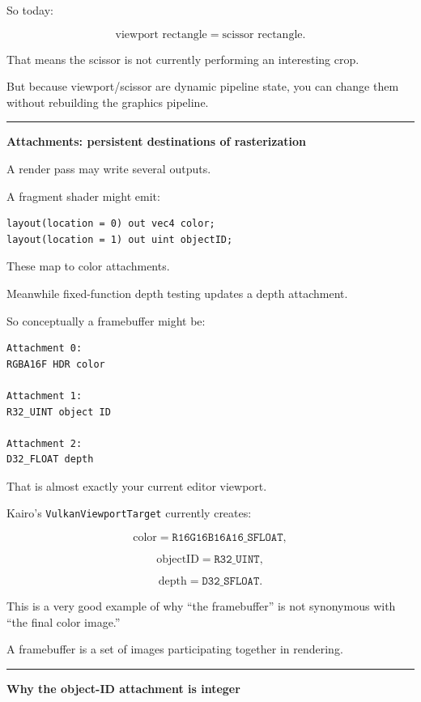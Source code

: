 So today:

\[
\text{viewport rectangle}
=
\text{scissor rectangle}.
\]

That means the scissor is not currently performing an interesting crop.

But because viewport/scissor are dynamic pipeline state, you can change them without rebuilding the graphics pipeline.

\begin{center}\rule{0.5\linewidth}{0.5pt}\end{center}

\textbf{Attachments: persistent destinations of rasterization}

A render pass may write several outputs.

A fragment shader might emit:

\begin{verbatim}
layout(location = 0) out vec4 color;
layout(location = 1) out uint objectID;
\end{verbatim}

These map to color attachments.

Meanwhile fixed-function depth testing updates a depth attachment.

So conceptually a framebuffer might be:

\begin{verbatim}
Attachment 0:
RGBA16F HDR color

Attachment 1:
R32_UINT object ID

Attachment 2:
D32_FLOAT depth
\end{verbatim}

That is almost exactly your current editor viewport.

Kairo's \texttt{VulkanViewportTarget} currently creates:

\[
\text{color} = \texttt{R16G16B16A16_SFLOAT},
\]

\[
\text{objectID} = \texttt{R32_UINT},
\]

\[
\text{depth} = \texttt{D32_SFLOAT}.
\]

This is a very good example of why ``the framebuffer'' is not synonymous with ``the final color image.''

A framebuffer is a set of images participating together in rendering.

\begin{center}\rule{0.5\linewidth}{0.5pt}\end{center}

\textbf{Why the object-ID attachment is integer}

